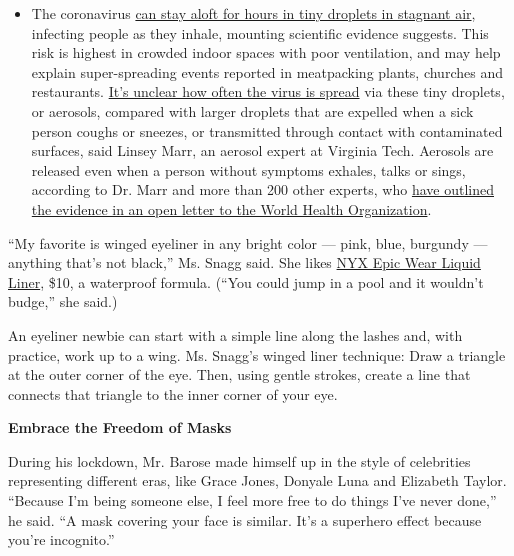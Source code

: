 \begin{itemize}
  \begin{itemize}
  \tightlist
  \item
    The coronavirus
    \href{https://www.nytimes3xbfgragh.onion/2020/07/04/health/239-experts-with-one-big-claim-the-coronavirus-is-airborne.html?action=click\&pgtype=Article\&state=default\&region=MAIN_CONTENT_3\&context=storylines_faq}{can
    stay aloft for hours in tiny droplets in stagnant air}, infecting
    people as they inhale, mounting scientific evidence suggests. This
    risk is highest in crowded indoor spaces with poor ventilation, and
    may help explain super-spreading events reported in meatpacking
    plants, churches and restaurants.
    \href{https://www.nytimes3xbfgragh.onion/2020/07/06/health/coronavirus-airborne-aerosols.html?action=click\&pgtype=Article\&state=default\&region=MAIN_CONTENT_3\&context=storylines_faq}{It's
    unclear how often the virus is spread} via these tiny droplets, or
    aerosols, compared with larger droplets that are expelled when a
    sick person coughs or sneezes, or transmitted through contact with
    contaminated surfaces, said Linsey Marr, an aerosol expert at
    Virginia Tech. Aerosols are released even when a person without
    symptoms exhales, talks or sings, according to Dr. Marr and more
    than 200 other experts, who
    \href{https://academic.oup.com/cid/article/doi/10.1093/cid/ciaa939/5867798}{have
    outlined the evidence in an open letter to the World Health
    Organization}.
  \end{itemize}
\end{itemize}

``My favorite is winged eyeliner in any bright color --- pink, blue,
burgundy --- anything that's not black,'' Ms. Snagg said. She likes
\href{https://www.nyxcosmetics.com/eyes/eyeliner/epic-wear-liquid-liner/NYX_806.html}{NYX
Epic Wear Liquid Liner}, \$10, a waterproof formula. (``You could jump
in a pool and it wouldn't budge,'' she said.)

An eyeliner newbie can start with a simple line along the lashes and,
with practice, work up to a wing. Ms. Snagg's winged liner technique:
Draw a triangle at the outer corner of the eye. Then, using gentle
strokes, create a line that connects that triangle to the inner corner
of your eye.

\textbf{Embrace the Freedom of Masks}

During his lockdown, Mr. Barose made himself up in the style of
celebrities representing different eras, like Grace Jones, Donyale Luna
and Elizabeth Taylor. ``Because I'm being someone else, I feel more free
to do things I've never done,'' he said. ``A mask covering your face is
similar. It's a superhero effect because you're incognito.''

